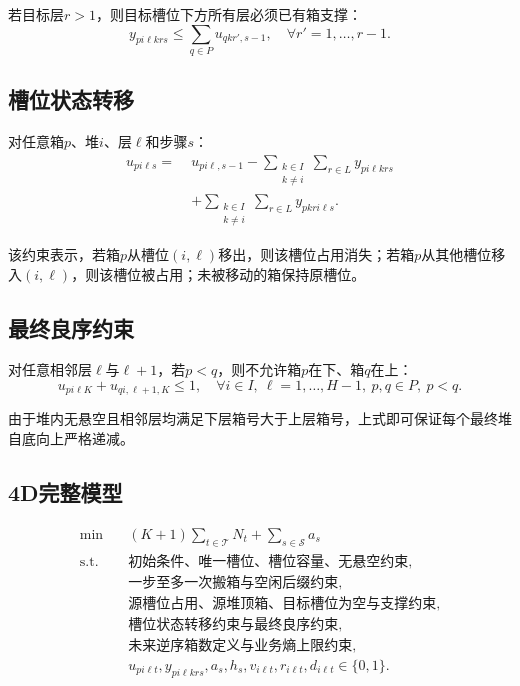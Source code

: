 \documentclass[11pt,a4paper]{ctexart}
\begin{document}
若目标层$r>1$，则目标槽位下方所有层必须已有箱支撑：
\begin{equation}
y_{pi\ell krs}
\le
\sum_{q\in P}u_{qk r',s-1},
\quad \forall r'=1,\ldots,r-1.
\end{equation}

\subsection{槽位状态转移}
对任意箱$p$、堆$i$、层$\ell$和步骤$s$：
\begin{equation}
\begin{aligned}
u_{pi\ell s}
=\;&u_{pi\ell,s-1}
-\sum_{\substack{k\in I\\k\ne i}}\sum_{r\in L}
y_{pi\ell krs}\\
&+\sum_{\substack{k\in I\\k\ne i}}\sum_{r\in L}
y_{pkr i\ell s}.
\end{aligned}
\end{equation}

该约束表示，若箱$p$从槽位$(i,\ell)$移出，则该槽位占用消失；若箱$p$从其他槽位移入$(i,\ell)$，则该槽位被占用；未被移动的箱保持原槽位。

\subsection{最终良序约束}
对任意相邻层$\ell$与$\ell+1$，若$p<q$，则不允许箱$p$在下、箱$q$在上：
\begin{equation}
u_{pi\ell K}+u_{qi,\ell+1,K}\le 1,
\quad \forall i\in I,\ \ell=1,\ldots,H-1,\ p,q\in P,\ p<q.
\end{equation}

由于堆内无悬空且相邻层均满足下层箱号大于上层箱号，上式即可保证每个最终堆自底向上严格递减。

\subsection{4D完整模型}
\begin{equation}
\begin{aligned}
\min\quad
& (K+1)\sum_{t\in\mathcal{T}}N_t+\sum_{s\in\mathcal{S}} a_s\\
\textrm{s.t.}\quad
& \text{初始条件、唯一槽位、槽位容量、无悬空约束},\\
& \text{一步至多一次搬箱与空闲后缀约束},\\
& \text{源槽位占用、源堆顶箱、目标槽位为空与支撑约束},\\
& \text{槽位状态转移约束与最终良序约束},\\
& \text{未来逆序箱数定义与业务熵上限约束},\\
& u_{pi\ell t},y_{pi\ell krs},a_s,h_s,v_{i\ell t},r_{i\ell t},d_{i\ell t}\in\{0,1\}.
\end{aligned}
\end{equation}
\end{document}
